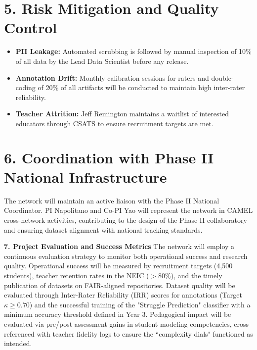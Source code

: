 \documentclass[11pt]{article}
\begin{document}
\section*{5. Risk Mitigation and Quality Control}
\begin{itemize}[noitemsep, topsep=2pt]
    \item \textbf{PII Leakage:} Automated scrubbing is followed by manual inspection of 10\% of all data by the Lead Data Scientist before any release.
    \item \textbf{Annotation Drift:} Monthly calibration sessions for raters and double-coding of 20\% of all artifacts will be conducted to maintain high inter-rater reliability.
    \item \textbf{Teacher Attrition:} Jeff Remington maintains a waitlist of interested educators through CSATS to ensure recruitment targets are met.
\end{itemize}

\section*{6. Coordination with Phase II National Infrastructure}
The network will maintain an active liaison with the Phase II National Coordinator. PI Napolitano and Co-PI Yao will represent the network in CAMEL cross-network activities, contributing to the design of the Phase II collaboratory and ensuring dataset alignment with national tracking standards.

\textbf{7. Project Evaluation and Success Metrics} 
The network will employ a continuous evaluation strategy to monitor both operational success and research quality. Operational success will be measured by recruitment targets (4,500 students), teacher retention rates in the NEIC ($>80\%$), and the timely publication of datasets on FAIR-aligned repositories.
Dataset quality will be evaluated through Inter-Rater Reliability (IRR) scores for annotations (Target $\kappa \geq 0.70$) and the successful training of the "Struggle Prediction" classifier with a minimum accuracy threshold defined in Year 3. Pedagogical impact will be evaluated via pre/post-assessment gains in student modeling competencies, cross-referenced with teacher fidelity logs to ensure the ``complexity dials" functioned as intended.
\end{document}
